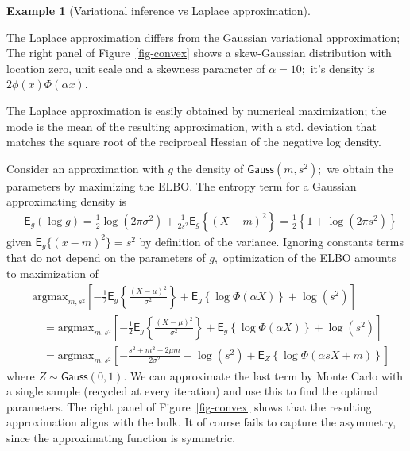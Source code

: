 \documentclass[
  11pt,
  letterpaper,
]{scrbook}
\theoremstyle{plain}
\theoremstyle{plain}
\theoremstyle{plain}
\theoremstyle{definition}
\theoremstyle{definition}
\newtheorem{example}{Example}[chapter]
\theoremstyle{definition}
\theoremstyle{remark}
\begin{document}
\begin{example}[Variational inference vs Laplace
approximation]\protect\hypertarget{exm-varional-vs-laplace}{}\label{exm-varional-vs-laplace}

The Laplace approximation differs from the Gaussian variational
approximation; The right panel of Figure~\ref{fig-convex} shows a
skew-Gaussian distribution with location zero, unit scale and a skewness
parameter of \(\alpha=10;\) it's density is \(2\phi(x)\Phi(\alpha x).\)

The Laplace approximation is easily obtained by numerical maximization;
the mode is the mean of the resulting approximation, with a std.
deviation that matches the square root of the reciprocal Hessian of the
negative log density.

Consider an approximation with \(g\) the density of
\(\mathsf{Gauss}(m, s^2);\) we obtain the parameters by maximizing the
ELBO. The entropy term for a Gaussian approximating density is
\begin{align*}
-\mathsf{E}_g(\log g) = \frac{1}{2}\log(2\pi \sigma^2) + \frac{1}{2s^2}\mathsf{E}_g\left\{(X-m)^2 \right\} = \frac{1}{2} \left\{1+\log(2\pi s^2)\right\}
\end{align*} given \(\mathsf{E}_g\{(x-m)^2\}=s^2\) by definition of the
variance. Ignoring constants terms that do not depend on the parameters
of \(g,\) optimization of the ELBO amounts to maximization of
\begin{align*}
&\mathrm{argmax}_{m, s^2} \left[-\frac{1}{2} \mathsf{E}_g \left\{ \frac{(X-\mu)^2}{\sigma^2}\right\} + \mathsf{E}_g\left\{\log \Phi(\alpha X)\right\} + \log(s^2) \right] \\
&\quad =\mathrm{argmax}_{m, s^2} \left[ -\frac{1}{2} \mathsf{E}_g \left\{ \frac{(X-\mu)^2}{\sigma^2}\right\} + \mathsf{E}_g\left\{\log \Phi(\alpha X)\right\} + \log(s^2) \right]
\\&\quad =\mathrm{argmax}_{m, s^2} \left[ -\frac{s^2 + m^2 -2\mu m}{2\sigma^2} + \log(s^2) + \mathsf{E}_{Z}\left\{\log \Phi(\alpha sX+m)\right\} \right]
\end{align*} where \(Z \sim \mathsf{Gauss}(0,1).\) We can approximate
the last term by Monte Carlo with a single sample (recycled at every
iteration) and use this to find the optimal parameters. The right panel
of Figure~\ref{fig-convex} shows that the resulting approximation aligns
with the bulk. It of course fails to capture the asymmetry, since the
approximating function is symmetric.

\end{example}
\end{document}
